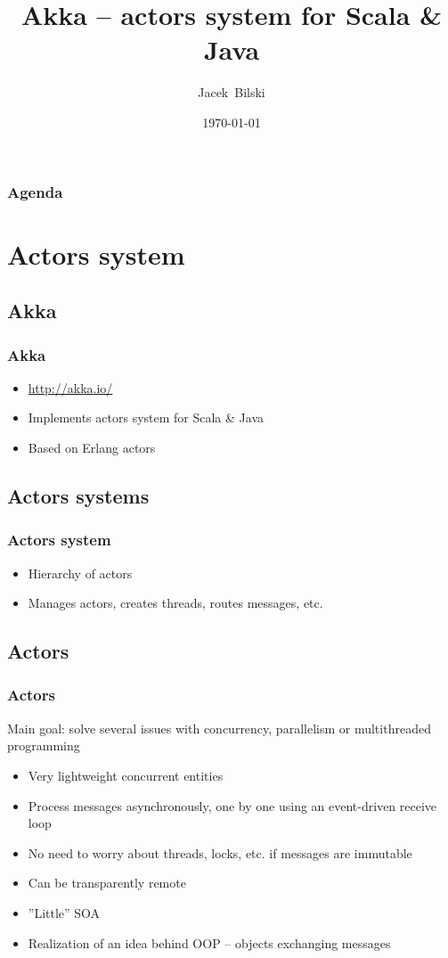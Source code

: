 \documentclass[xcolor=dvipsnames]{beamer}
\title{Akka -- actors system for Scala \& Java}
\author{Jacek~Bilski}
\date{\today}
\begin{document}
\begin{frame}
\titlepage
\end{frame}

\begin{frame}
\frametitle{Agenda}
\tableofcontents[pausesections]
\end{frame}

\section{Actors system}

\subsection{Akka}

\begin{frame}
\frametitle{Akka}
\begin{itemize}
\item \href{http://akka.io/}{http://akka.io/}
\item Implements actors system for Scala \& Java
\item Based on Erlang actors
\end{itemize}
\end{frame}

\subsection{Actors systems}

\begin{frame}
\frametitle{Actors system}
\begin{itemize}
\item Hierarchy of actors
\item Manages actors, creates threads, routes messages, etc.
\end{itemize}
\end{frame}

\subsection{Actors}

\begin{frame}
\frametitle{Actors}
Main goal: solve several issues with concurrency, parallelism or multithreaded programming
\begin{itemize}
\item Very lightweight concurrent entities
\item Process messages asynchronously, one by one using an event-driven receive loop
\item No need to worry about threads, locks, etc. if messages are immutable
\item Can be transparently remote
\item ''Little'' SOA
\item Realization of an idea behind OOP -- objects exchanging messages
\end{itemize}
\end{frame}
\end{document}
